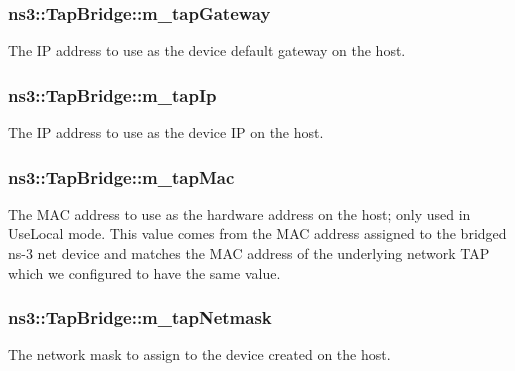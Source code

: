 \subsubsection[{\texorpdfstring{m\+\_\+tap\+Gateway}{m_tapGateway}}]{ ns3\+::\+Tap\+Bridge\+::m\+\_\+tap\+Gateway\hspace{0.3cm}{\ttfamily [private]}}\hypertarget{classns3_1_1TapBridge_ad90dad655607615d92822a361ac21fb1}{}\label{classns3_1_1TapBridge_ad90dad655607615d92822a361ac21fb1}
The IP address to use as the device default gateway on the host. 
\subsubsection[{\texorpdfstring{m\+\_\+tap\+Ip}{m_tapIp}}]{ ns3\+::\+Tap\+Bridge\+::m\+\_\+tap\+Ip\hspace{0.3cm}{\ttfamily [private]}}\hypertarget{classns3_1_1TapBridge_a8cfe2b69cef36dbf048cb9006318b41b}{}\label{classns3_1_1TapBridge_a8cfe2b69cef36dbf048cb9006318b41b}
The IP address to use as the device IP on the host. 
\subsubsection[{\texorpdfstring{m\+\_\+tap\+Mac}{m_tapMac}}]{ ns3\+::\+Tap\+Bridge\+::m\+\_\+tap\+Mac\hspace{0.3cm}{\ttfamily [private]}}\hypertarget{classns3_1_1TapBridge_afdaa87d8c5a5e249ee8d94f75183e91f}{}\label{classns3_1_1TapBridge_afdaa87d8c5a5e249ee8d94f75183e91f}
The M\+AC address to use as the hardware address on the host; only used in Use\+Local mode. This value comes from the M\+AC address assigned to the bridged ns-\/3 net device and matches the M\+AC address of the underlying network T\+AP which we configured to have the same value. 
\subsubsection[{\texorpdfstring{m\+\_\+tap\+Netmask}{m_tapNetmask}}]{ ns3\+::\+Tap\+Bridge\+::m\+\_\+tap\+Netmask\hspace{0.3cm}{\ttfamily [private]}}\hypertarget{classns3_1_1TapBridge_a9374f832e2a96385651d27a5fbc7ba57}{}\label{classns3_1_1TapBridge_a9374f832e2a96385651d27a5fbc7ba57}
The network mask to assign to the device created on the host. 
